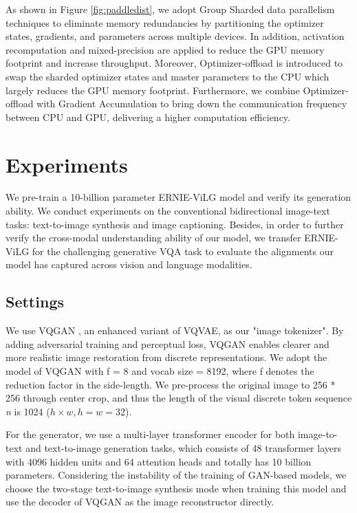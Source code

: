 \documentclass{article}
\begin{document}
As shown in Figure \ref{fig:paddledist}, we adopt Group Sharded data parallelism techniques \cite{rajbhandari2020ZeRO, yulong2021adaptive} to eliminate memory redundancies by partitioning the optimizer states, gradients, and parameters across multiple devices. In addition, activation recomputation \cite{chen2016recomputation} and mixed-precision \cite{micikevicius2017amp} are applied to reduce the GPU memory footprint and increase throughput. Moreover, Optimizer-offload \cite{rajbhandari2021ZeRO-offload} is introduced to swap the sharded optimizer states and master parameters to the CPU which largely reduces the GPU memory footprint. Furthermore, we combine Optimizer-offload with Gradient Accumulation to bring down the communication frequency between CPU and GPU, delivering a higher computation efficiency.


\section{Experiments}
 We pre-train a 10-billion parameter ERNIE-ViLG model and verify its generation ability. We conduct experiments on the conventional bidirectional image-text tasks: text-to-image synthesis and image captioning. Besides, in order to further verify the cross-modal understanding ability of our model, we transfer ERNIE-ViLG for the challenging generative VQA task to evaluate the alignments our model has captured across vision and language modalities. 

\subsection{Settings}
We use VQGAN \cite{esser2021taming}, an enhanced variant of VQVAE, as our "image tokenizer". By adding adversarial training and perceptual loss, VQGAN enables clearer and more realistic image restoration from discrete representations. We adopt the model of VQGAN with f = 8 and vocab size = 8192, where f denotes the reduction factor in the side-length. We pre-process the original image to 256 * 256 through center crop, and thus the length of the visual discrete token sequence \textit{n} is 1024 ($h \times w, h=w=32$). 

For the generator, we use a multi-layer transformer encoder for both image-to-text and text-to-image generation tasks, which consists of 48 transformer layers with 4096 hidden units and 64 attention heads and totally has 10 billion parameters. Considering the instability of the training of GAN-based models, we choose the two-stage text-to-image synthesis mode when training this model and use the decoder of VQGAN as the image reconstructor directly.
\end{document}
